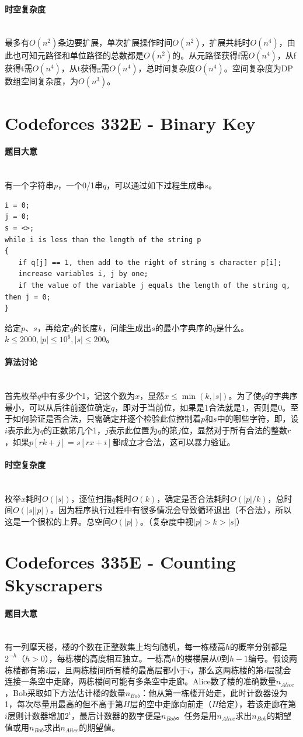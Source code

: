 \documentclass[UTF8]{ctexart}
\newcommand{\myparagraph}[1]{\paragraph{#1}\mbox{}\\}
\theoremstyle{nonumberplain}
\begin{document}
		\myparagraph{时空复杂度}
		
			最多有$O(n^2)$条边要扩展，单次扩展操作时间$O(n^2)$，扩展共耗时$O(n^4)$，由此也可知元路径和单位路径的总数都是$O(n^2)$的。从元路径获得f需$O(n^4)$，从f获得t需$O(n^4)$，从t获得g需$O(n^4)$，总时间复杂度$O(n^4)$。空间复杂度为DP数组空间复杂度，为$O(n^3)$。
	
	\section{Codeforces 332E - Binary Key}
	
		\myparagraph{题目大意}
		
			有一个字符串$p$，一个0/1串$q$，可以通过如下过程生成串$s$。
			
			\begin{verbatim}
i = 0;
j = 0;
s = <>;
while i is less than the length of the string p
{
　　if q[j] == 1, then add to the right of string s character p[i];
　　increase variables i, j by one;
　　if the value of the variable j equals the length of the string q, then j = 0;
}
			\end{verbatim}
			
			给定$p$、$s$，再给定$q$的长度$k$，问能生成出$s$的最小字典序的$q$是什么。$k \leq 2000, |p| \leq 10^6, |s| \leq 200$。
		
		\myparagraph{算法讨论}
		
			首先枚举$q$中有多少个1，记这个数为$x$，显然$x \leq \min(k,|s|)$。为了使$q$的字典序最小，可以从后往前逐位确定$q$，即对于当前位，如果是1合法就是1，否则是0。至于如何验证是否合法，只需确定并逐个检验此位控制着$p$和$s$中的哪些字符，即，设$i$表示此为$q$的正数第几个1，$j$表示此位置为$q$的第$j$位，显然对于所有合法的整数$r$，如果$p[rk+j]=s[rx+i]$都成立才合法，这可以暴力验证。
		
		\myparagraph{时空复杂度}
	
			枚举$x$耗时$O(|s|)$，逐位扫描$q$耗时$O(k)$，确定是否合法耗时$O(|p|/k)$，总时间$O(|s||p|)$。因为程序执行过程中有很多情况会导致循环退出（不合法），所以这是一个很松的上界。总空间$O(|p|)$。（复杂度中视$|p|>k>|s|$）
			
	\section{Codeforces 335E - Counting Skyscrapers}
	
		\myparagraph{题目大意}
		
			有一列摩天楼，楼的个数在正整数集上均匀随机，每一栋楼高$h$的概率分别都是$2^{-h}$（$h>0$），每栋楼的高度相互独立。一栋高$h$的楼楼层从0到$h-1$编号。假设两栋楼都有第$i$层，且两栋楼间所有楼的最高层都小于$i$，那么这两栋楼的第$i$层就会连接一条空中走廊，两栋楼间可能有多条空中走廊。Alice数了楼的准确数量$n_{Alice}$，Bob采取如下方法估计楼的数量$n_{Bob}$：他从第一栋楼开始走，此时计数器设为1，每次尽量用最高的但不高于第$H$层的空中走廊向前走（$H$给定），若该走廊在第$i$层则计数器增加$2^i$，最后计数器的数字便是$n_{Bob}$。任务是用$n_{Alice}$求出$n_{Bob}$的期望值或用$n_{Bob}$求出$n_{Alice}$的期望值。
		
\end{document}
